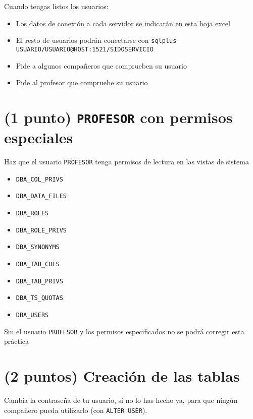 \documentclass[a4paper]{article}
\begin{document}
Cuando tengas listos los usuarios:
\begin{itemize}
\item Los datos de conexión a cada servidor \href{https://docs.google.com/spreadsheets/d/17A6TpGOixGVVZr1VlocN6ZhMuKqmQjD3XedyIne4ows/edit\#gid=0}{se indicarán en esta hoja excel}
\item El resto de usuarios podrán conectarse con \texttt{sqlplus USUARIO/USUARIO@HOST:1521/SIDOSERVICIO}
\item Pide a algunos compañeros que comprueben su usuario
\item Pide al profesor que compruebe su usuario
\end{itemize}

\section{(1 punto) \texttt{PROFESOR} con permisos especiales}
\label{sec:org0000009}
Haz que el usuario \texttt{PROFESOR} tenga permisos de lectura en las vistas de sistema
\begin{itemize}
\item \texttt{DBA\_COL\_PRIVS}
\item \texttt{DBA\_DATA\_FILES}
\item \texttt{DBA\_ROLES}
\item \texttt{DBA\_ROLE\_PRIVS}
\item \texttt{DBA\_SYNONYMS}
\item \texttt{DBA\_TAB\_COLS}
\item \texttt{DBA\_TAB\_PRIVS}
\item \texttt{DBA\_TS\_QUOTAS}
\item \texttt{DBA\_USERS}
\end{itemize}


\begin{Aviso}
Sin el usuario \texttt{PROFESOR} y los permisos especificados no se podrá corregir esta práctica
\end{Aviso}
\section{(2 puntos) Creación de las tablas}
\label{sec:org000000c}
Cambia la contraseña de tu usuario, si no lo has hecho ya, para que ningún compañero pueda utilizarlo (con \texttt{ALTER USER}).
\end{document}
